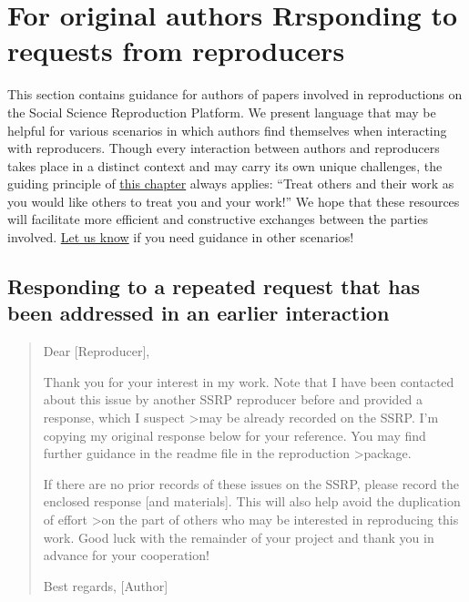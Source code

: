 \documentclass[]{book}
\begin{document}
\hypertarget{for-original-authors-rrsponding-to-requests-from-reproducers}{%
\section{For original authors Rrsponding to requests from reproducers}\label{for-original-authors-rrsponding-to-requests-from-reproducers}}

This section contains guidance for authors of papers involved in reproductions on the Social Science Reproduction Platform. We present language that may be helpful for various scenarios in which authors find themselves when interacting with reproducers. Though every interaction between authors and reproducers takes place in a distinct context and may carry its own unique challenges, the guiding principle of \href{https://bitss.github.io/ACRE/guidance-for-a-constructive-exchange-between-reproducers-and-original-authors.html}{this chapter} always applies: ``Treat others and their work as you would like others to treat you and your work!'' We hope that these resources will facilitate more efficient and constructive exchanges between the parties involved. \href{emailto:acre@berkeley.edu}{Let us know} if you need guidance in other scenarios!

\hypertarget{responding-to-a-repeated-request-that-has-been-addressed-in-an-earlier-interaction}{%
\subsection{Responding to a repeated request that has been addressed in an earlier interaction}\label{responding-to-a-repeated-request-that-has-been-addressed-in-an-earlier-interaction}}

\begin{quote}
Dear {[}Reproducer{]},

Thank you for your interest in my work. Note that I have been contacted about this issue by another SSRP reproducer before and provided a response, which I suspect \textgreater{}may be already recorded on the SSRP. I'm copying my original response below for your reference. You may find further guidance in the readme file in the reproduction \textgreater{}package.

If there are no prior records of these issues on the SSRP, please record the enclosed response {[}and materials{]}. This will also help avoid the duplication of effort \textgreater{}on the part of others who may be interested in reproducing this work.
Good luck with the remainder of your project and thank you in advance for your cooperation!

Best regards,
{[}Author{]}
\end{quote}
\end{document}
